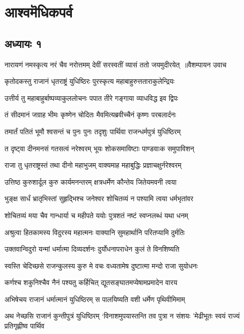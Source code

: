 \part{आश्वमॆधिकपर्व}
\chapter{अध्यायः १}
\threelineshloka
{नारायणं नमस्कृत्य नरं चैव नरोत्तमम्}
{देवीं सरस्वतीं व्यासं ततो जयमुदीरयेत् ॥वैशम्पायन उवाच}
{}


\twolineshloka
{कृतोदकस्तु राजानं धृतराष्ट्रं युधिष्ठिरः}
{पुरस्कृत्य महाबाहुरुत्तताराकुलेन्द्रियः}


\twolineshloka
{उत्तीर्य तु महाबाहुर्बाष्पव्याकुललोचनः}
{पपात तीरे गङ्गाया व्याधविद्ध इव द्विपः}


\twolineshloka
{तं सीदमानं जग्राह भीमः कृष्णेन चोदितः}
{मैवमित्यब्रवीच्चैनं कृष्णः परबलार्दनः}


\twolineshloka
{तमार्तं पतितं भूमौ श्वसन्तं च पुनः पुनः}
{तदृशुः पार्थिवा राजन्धर्मपुत्रं युधिष्ठिरम्}


\twolineshloka
{त दृष्ट्वा दीनमनसं गतसत्वं नरेश्वरम्}
{भूयः शोकसमाविष्टाः पाण्डवाःक समुपाविशन्}


\twolineshloka
{राजा तु धृतराष्ट्रस्तं तथा दीनो महाभुजम्}
{वाक्यमाह महाबुद्धिः प्रज्ञाचक्षुर्नरेश्वरम्}


\twolineshloka
{उत्तिष्ठ कुरुशार्दूल कुरु कार्यमनन्तरम्}
{क्षत्रधर्मेण कौन्तेय जितेयमवनी त्वया}


\twolineshloka
{भुङ्क्ष सार्धं भ्रातृभिस्तां सुहृद्भिश्च जनेश्वर}
{शोचितव्यं न पश्यामि त्वया धर्मभृतांवर}


\twolineshloka
{शोचितव्यं मया चैव गान्धार्या च महीपते}
{ययोः पुत्रशतं नष्टं स्वप्नलब्धं यथा धनम्}


\twolineshloka
{अश्रुत्वा हितकामस्य विदुरस्य महात्मनः}
{वाक्यानि सुमहार्थानि परितप्यामि दुर्मतिः}


\twolineshloka
{उक्तवान्विदुरो यन्मां धर्मात्मा दिव्यदर्शनः}
{दुर्योधनापराधेन कुलं ते विनशिष्यति}


\twolineshloka
{स्वस्ति चेदिच्छसे राजन्कुलस्य कुरु मे वचः}
{वध्यतामेष दुष्टात्मा मन्दो राजा सुयोधनः}


\twolineshloka
{कर्णश्च शकुनिश्चैव नैनं पश्यतु कर्हिचित्}
{द्यूतसङ्घातमप्येषामप्रमादेन वारय}


\twolineshloka
{अभिषेचय राजानं धर्मात्मानं युधिष्ठिरम्}
{स पालयिष्यति वशी धर्मेण पृथिवीमिमाम्}


\threelineshloka
{अथ नेच्छसि राजानं कुन्तीपुत्रं युधिष्ठिरम्}
{`विनाशमुपयास्तन्ति तव पुत्रा न संशयः}
{'मेढीभूतः स्वयं राज्यं प्रतिगृह्णीष्व पार्थिव}


